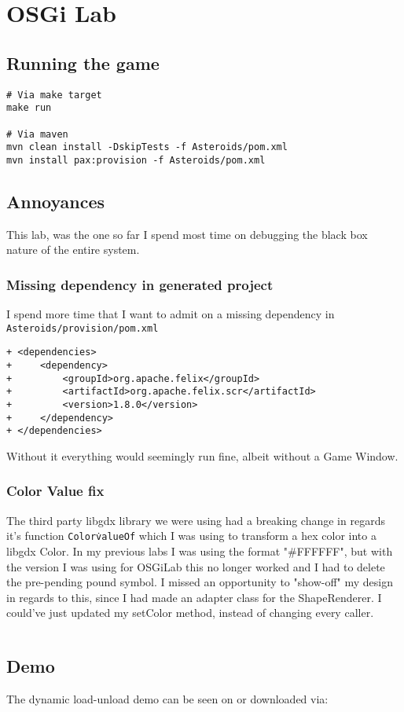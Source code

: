 \section{OSGi Lab}

\subsection{Running the game}
\begin{verbatim}
# Via make target
make run

# Via maven
mvn clean install -DskipTests -f Asteroids/pom.xml
mvn install pax:provision -f Asteroids/pom.xml
\end{verbatim}

\subsection{Annoyances}

This lab, was the one so far I spend most time on debugging the black box nature
of the entire system.

\subsubsection{Missing dependency in generated project}

I spend more time that I want to admit on a missing dependency in \texttt{Asteroids/provision/pom.xml}
\begin{verbatim}
+ <dependencies>
+     <dependency>
+         <groupId>org.apache.felix</groupId>
+         <artifactId>org.apache.felix.scr</artifactId>
+         <version>1.8.0</version>
+     </dependency>
+ </dependencies>
\end{verbatim}

Without it everything would seemingly run fine, albeit without a Game Window.

\subsubsection{Color Value fix}
The third party libgdx library we were using had a breaking change in regards
it's function \texttt{Color\.valueOf} which I was using to transform a hex color
into a libgdx Color. In my previous labs I was using the format "#FFFFFF", but
with the version I was using for OSGiLab this no longer worked and I had to
delete the pre-pending pound symbol.
I missed an opportunity to "show-off" my design in regards to this, since I had
made an adapter class for the ShapeRenderer. I could've just updated my setColor
method, instead of changing every caller.

\inputminted{java}{code/color-value-fix.java}


\subsection{Demo}
The dynamic load-unload demo can be seen on
 or downloaded via:
